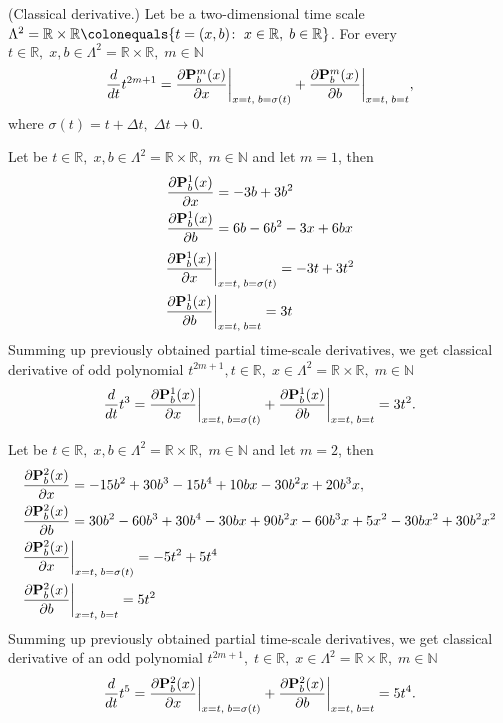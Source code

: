 \begin{cor}
    \label{derivative_case}
    (Classical derivative.)
    Let be a two-dimensional time scale
    $\Lambda^2 = \mathbb{R} \times \mathbb{R} \colonequals \{t=(x, b) \colon \; x\in \mathbb{R}, \; b\in\mathbb{R} \}$.
    For every $t\in\mathbb{R}, \; x,b\in \Lambda^2 = \mathbb{R} \times \mathbb{R}, \; m\in\mathbb{N}$
    \[
        \derivative{t^{2m+1}}{t}
        = \pderivative{\polynomialP{m}{b}{x}}{x} \bigg |_{x = t, \; b = \sigma(t)}
        + \pderivative{\polynomialP{m}{b}{x}}{b} \bigg |_{x = t, \; b = t},
    \]
    where $\sigma(t) = t + \Delta t, \; \Delta t \to 0.$
\end{cor}
\begin{examp}
    Let be $t\in\mathbb{R}, \; x,b\in \Lambda^2 = \mathbb{R} \times \mathbb{R}, \; m\in\mathbb{N}$ and let $m=1$, then
    \begin{align*}
        \pderivative{\polynomialP{1}{b}{x}}{x} &= -3 b + 3 b^2 \\
        \pderivative{\polynomialP{1}{b}{x}}{b} &= 6 b - 6 b^2 - 3 x + 6 b x
    \end{align*}
    \begin{align*}
        &\pderivative{\polynomialP{1}{b}{x}}{x} \bigg |_{x = t, \; b = \sigma(t)} = -3t + 3t^2 \\
        &\pderivative{\polynomialP{1}{b}{x}}{b} \bigg |_{x = t, \; b = t} = 3t
    \end{align*}
    Summing up previously obtained partial time-scale derivatives, we get classical derivative of odd polynomial
    $t^{2m+1}, t\in\mathbb{R}, \; x\in \Lambda^2 = \mathbb{R} \times \mathbb{R}, \; m\in\mathbb{N}$
    \[
        \derivative{t^3}{t}
        = \pderivative{\polynomialP{1}{b}{x}}{x} \bigg |_{x = t, \; b = \sigma(t)}
        + \pderivative{\polynomialP{1}{b}{x}}{b} \bigg |_{x = t, \; b = t}
        = 3t^2.
    \]
\end{examp}
\begin{examp}
    Let be $t\in\mathbb{R}, \; x,b\in \Lambda^2 = \mathbb{R} \times \mathbb{R}, \; m\in\mathbb{N}$ and let $m=2$, then
    \begin{align*}
        &\pderivative{\polynomialP{2}{b}{x}}{x} = -15 b^2 + 30 b^3 - 15 b^4 + 10 b x - 30 b^2 x + 20 b^3 x, \\
        &\pderivative{\polynomialP{2}{b}{x}}{b} = 30 b^2 - 60 b^3 + 30 b^4 - 30 b x + 90 b^2 x - 60 b^3 x + 5 x^2 - 30 b x^2
        + 30 b^2 x^2 \\
        &\pderivative{\polynomialP{2}{b}{x}}{x} \bigg |_{x = t, \; b = \sigma(t)} = -5 t^2 + 5 t^4 \\
        &\pderivative{\polynomialP{2}{b}{x}}{b} \bigg |_{x = t, \; b = t} = 5 t^2
    \end{align*}
    Summing up previously obtained partial time-scale derivatives, we get classical derivative of an odd polynomial
    $t^{2m+1}, \; t\in\mathbb{R}, \; x\in \Lambda^2 = \mathbb{R} \times \mathbb{R}, \; m\in\mathbb{N}$
    \[
        \derivative{t^5}{t}
        = \pderivative{\polynomialP{2}{b}{x}}{x} \bigg |_{x = t, \; b = \sigma(t)}
        + \pderivative{\polynomialP{2}{b}{x}}{b} \bigg |_{x = t, \; b = t}
        = 5t^4.
    \]
\end{examp}